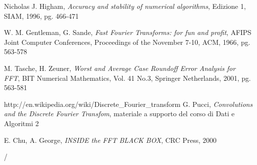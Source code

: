 \begin{thebibliography}{99}
 Nicholas J. Higham, \emph{Accuracy and stability of numerical algorithms}, Edizione 1, SIAM, 1996, pg. 466-471

 W. M. Gentleman, G. Sande, \emph{Fast Fourier Transforms: for fun and profit}, AFIPS Joint Computer Conferences, Proceedings of the November 7-10, ACM, 1966, pg. 563-578

M. Tasche, H. Zeuner, \emph{Worst and Average Case Roundoff Error Analysis for FFT}, BIT Numerical Mathematics, Vol. 41 No.3, Springer Netherlands, 2001, pg. 563-581

 http://en.wikipedia.org/wiki/Discrete\_Fourier\_transform
G. Pucci, \emph{Convolutions and the Discrete Fourier Transfom}, materiale a supporto del corso di Dati e Algoritmi 2

 E. Chu, A. George, \emph{INSIDE the FFT BLACK BOX}, CRC Press, 2000





\end{thebibliography}

 / 